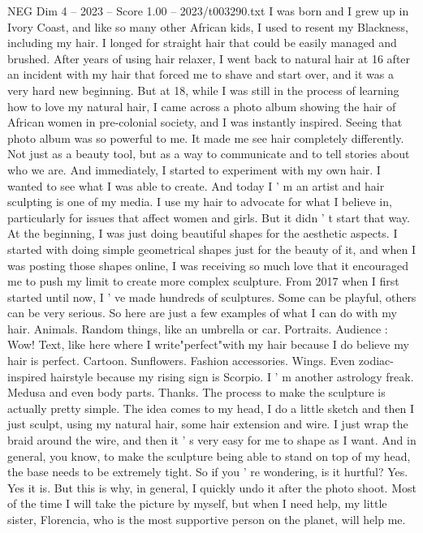 \begin{textsample}{NEG Dim 4 – 2023 – Score 1.00 – 2023/t003290.txt}  \label{ex:f4_neg_052}
I was born and I grew up in Ivory Coast, and like so many other African kids, I used to resent my Blackness, including my hair.
I longed for straight hair that could be easily managed and brushed.
After years of using hair relaxer, I went back to natural hair at 16 after an incident with my hair that forced me to shave and start over, and it was a very hard new beginning.
But at 18, while I was still in the process of learning how to love my natural hair, I came across a photo album showing the hair of African women in pre-colonial society, and I was instantly inspired.
Seeing that photo album was so powerful to me.
It made me see hair completely differently.
Not just as a beauty tool, but as a way to communicate and to tell stories about who we are.
And immediately, I started to experiment with my own hair.
I wanted to see what I was able to create.
And today I ' m an artist and hair sculpting is one of my media.
I use my hair to advocate for what I believe in, particularly for issues that affect women and girls.
But it didn ' t start that way.
At the beginning, I was just doing beautiful shapes for the aesthetic aspects.
I started with doing simple geometrical shapes just for the beauty of it, and when I was posting those shapes online, I was receiving so much love that it encouraged me to push my limit to create more complex sculpture.
From 2017 when I first started until now, I ' ve made hundreds of sculptures.
Some can be playful, others can be very serious.
So here are just a few examples of what I can do with my hair.
Animals.
Random things, like an umbrella or car.
Portraits.
Audience : Wow!
Text, like here where I write"perfect"with my hair because I do believe my hair is perfect.
Cartoon.
Sunflowers.
Fashion accessories.
Wings.
Even zodiac-inspired hairstyle because my rising sign is Scorpio.
I ' m another astrology freak.
Medusa and even body parts.
Thanks.
The process to make the sculpture is actually pretty simple.
The idea comes to my head, I do a little sketch and then I just sculpt, using my natural hair, some hair extension and wire.
I just wrap the braid around the wire, and then it ' s very easy for me to shape as I want.
And in general, you know, to make the sculpture being able to stand on top of my head, the base needs to be extremely tight.
So if you ' re wondering, is it hurtful?
Yes.
Yes it is.
But this is why, in general, I quickly undo it after the photo shoot.
Most of the time I will take the picture by myself, but when I need help, my little sister, Florencia, who is the most supportive person on the planet, will help me.

\end{textsample}
